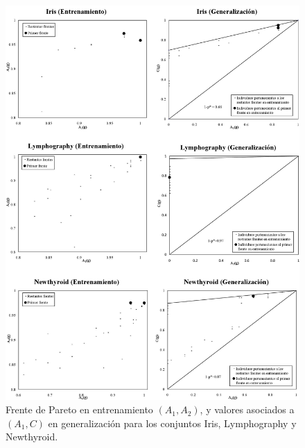\begin{figure}[!htb]
\centering
	\includegraphics[keepaspectratio,width=13cm]{figuras/tanda5.jpg}
\caption{Frente de Pareto en entrenamiento $(A_{1},A_{2})$, y valores asociados a
$(A_{1},C)$ en generalización para los conjuntos Iris, Lymphography y Newthyroid.}
\label{tanda5}
\end{figure}

